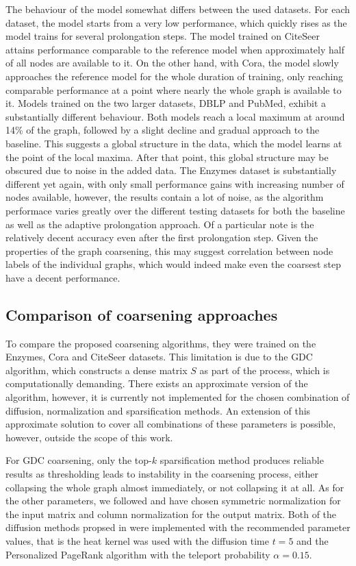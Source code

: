 The behaviour of the model somewhat differs between the used datasets. For each dataset, the model starts from a very low performance, which quickly rises as the model trains for several prolongation steps. The model trained on CiteSeer attains performance comparable to the reference model when approximately half of all nodes are available to it. On the other hand, with Cora, the model slowly approaches the reference model for the whole duration of training, only reaching comparable performance at a point where nearly the whole graph is available to it. Models trained on the two larger datasets, DBLP and PubMed, exhibit a substantially different behaviour. Both models reach a local maximum at around 14\% of the graph, followed by a slight decline and gradual approach to the baseline. This suggests a global structure in the data, which the model learns at the point of the local maxima. After that point, this global structure may be obscured due to noise in the added data. The Enzymes dataset is substantially different yet again, with only small performance gains with increasing number of nodes available, however, the results contain a lot of noise, as the algorithm performace varies greatly over the different testing datasets for both the baseline as well as the adaptive prolongation approach. Of a particular note is the relatively decent accuracy even after the first prolongation step. Given the properties of the graph coarsening, this may suggest correlation between node labels of the individual graphs, which would indeed make even the coarsest step have a decent performance.


\subsection{Comparison of coarsening approaches}

To compare the proposed coarsening algorithms, they were trained on the Enzymes, Cora and CiteSeer datasets. This limitation is due to the GDC algorithm, which constructs a dense matrix \( S \) as part of the process, which is computationally demanding. There exists an approximate version of the algorithm, however, it is currently not implemented for the chosen combination of diffusion, normalization and sparsification methods. An extension of this approximate solution to cover all combinations of these parameters is possible, however, outside the scope of this work.

For GDC coarsening, only the top-\( k \) sparsification method produces reliable results as thresholding leads to instability in the coarsening process, either collapsing the whole graph almost immediately, or not collapsing it at all. As for the other parameters, we followed \cite{gasteiger_diffusion_2019} and have chosen symmetric normalization for the input matrix and column normalization for the output matrix. Both of the diffusion methods propsed in \cite{gasteiger_diffusion_2019} were implemented with the recommended parameter values, that is the heat kernel was used with the diffusion time \( t = 5 \) and the Personalized PageRank algorithm with the teleport probability \( \alpha = 0.15 \).

